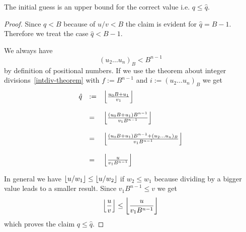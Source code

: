 \begin{theorem}
    \label{initial-guess-upper-bound}
    The initial guess is an upper bound for the correct value i.e. $q \le
    \hat{q}$.

    \begin{proof}
        Since $q < B$ because of $u/v < B$ the claim is evident for $\hat{q} = B
        - 1$. Therefore we treat the case $\hat{q} < B - 1$.

        We always have
        $$
            (u_2 \ldots u_n)_B < B^{n-1}
        $$
        by definition of positional numbers. If we use the theorem about integer
        divisions~\ref{intdiv-theorem} with $f := B^{n-1}$ and $i := (u_2 \ldots
        u_n)_B$ we get
        $$
        \begin{array}{lll}
            \hat{q}
            &:=&
            \left\lfloor \frac{u_0 B + u_1}{v_1} \right\rfloor
            \\
            \\
            &=&
            \left\lfloor \frac{(u_0 B + u_1) B^{n-1}}{v_1 B^{n-1}} \right\rfloor
            \\
            \\
            &=&
            \left\lfloor \frac{(u_0 B + u_1) B^{n-1} + (u_2 \ldots u_n)_B}{v_1 B^{n-1}} \right\rfloor
            \\
            \\
            &=&
            \left\lfloor \frac{u}{v_1 B^{n-1}} \right\rfloor
        \end{array}
        $$

        In general we have $\left\lfloor u / w_1 \right\rfloor \le \left\lfloor u / w_2 \right\rfloor$ if $w_2 \le
        w_1$ because dividing by a bigger value leads to a smaller result. Since
        $v_1 B^{n-1} \le v$ we get
        $$
            \left\lfloor \frac{u}{v} \right\rfloor \le \left\lfloor \frac{u}{v_1 B^{n-1}} \right\rfloor
        $$
        which proves the claim $q \le \hat{q}$.
    \end{proof}
\end{theorem}


